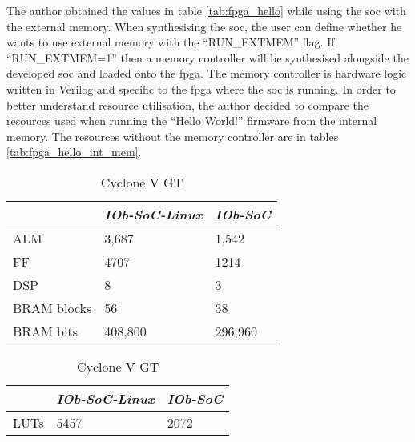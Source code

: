 The author obtained the values in table \ref{tab:fpga_hello} while using the \acrshort{soc} with the external memory. When synthesising the \acrshort{soc}, the user can define whether he wants to use external memory with the \enquote{RUN\_EXTMEM} flag. If \enquote{RUN\_EXTMEM=1} then a memory controller will be synthesised alongside the developed \acrshort{soc} and loaded onto the \acrshort{fpga}. The memory controller is hardware logic written in Verilog and specific to the \acrshort{fpga} where the \acrshort{soc} is running. In order to better understand resource utilisation, the author decided to compare the resources used when running the \enquote{Hello World!} firmware from the internal memory. The resources without the memory controller are in tables \ref{tab:fpga_hello_int_mem}.

\begin{table}[!ht]
    \begin{subtable}[h]{0.45\textwidth}
        \centering
        \begin{tabular}{l|l|l|}
            \cline{2-3}
                                              & \textit{IOb-SoC-Linux} & \textit{IOb-SoC} \\ \hline
            \multicolumn{1}{|l|}{ALM}         & 3,687                  & 1,542            \\ \hline
            \multicolumn{1}{|l|}{FF}          & 4707                   & 1214             \\ \hline
            \multicolumn{1}{|l|}{DSP}         & 8                      & 3                \\ \hline
            \multicolumn{1}{|l|}{BRAM blocks} & 56                     & 38               \\ \hline
            \multicolumn{1}{|l|}{BRAM bits}   & 408,800                & 296,960          \\ \hline
        \end{tabular}
       \caption{Cyclone V GT}
       \label{tab:cyclone_hello_int_mem}
    \end{subtable}
    \hfill
    \begin{subtable}[h]{0.45\textwidth}
        \centering
        \begin{tabular}{l|l|l|}
            \cline{2-3}
                                            & \textit{IOb-SoC-Linux} & \textit{IOb-SoC} \\ \hline
            \multicolumn{1}{|l|}{LUTs}      & 5457                   & 2072             \\ \hline

\end{tabular}
\end{subtable}
\end{table}

